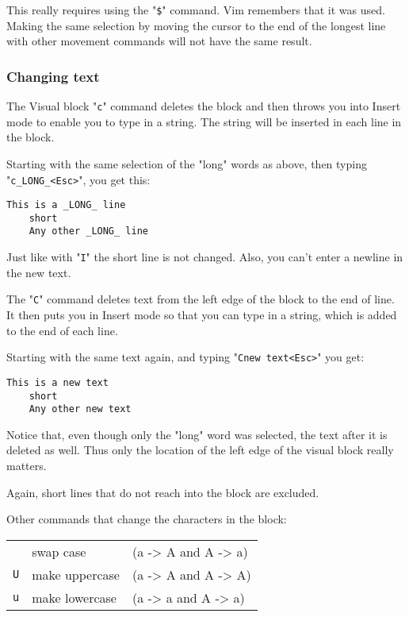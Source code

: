 {This really requires using the "\texttt{\$}" command.
Vim remembers that it was used.
Making the same selection by moving the cursor to the end of the longest line with other movement commands will not have the same result.
\subsubsection{Changing text}
The Visual block "\texttt{c}" command deletes the block and then throws you into Insert mode to enable you to type in a string.
The string will be inserted in each line in the block.

Starting with the same selection of the "long" words as above, then typing "\texttt{c\_LONG\_<Esc>}", you get this:

\begin{Verbatim}[samepage=true]
    This is a _LONG_ line 
    short 
    Any other _LONG_ line 
\end{Verbatim}

Just like with "\texttt{I}" the short line is not changed.
Also, you can't enter a newline in the new text.

The "\texttt{C}" command deletes text from the left edge of the block to the end of line.
It then puts you in Insert mode so that you can type in a string, which is added to the end of each line.

Starting with the same text again, and typing "\texttt{Cnew text<Esc>}" you get:

\begin{Verbatim}[samepage=true]
    This is a new text 
    short 
    Any other new text 
\end{Verbatim}

Notice that, even though only the "long" word was selected, the text after it is deleted as well.
Thus only the location of the left edge of the visual block really matters.

Again, short lines that do not reach into the block are excluded.

Other commands that change the characters in the block:

\begin{center} \begin{tabular}{l l l}
	\texttt{~} & swap case & (a -> A and A -> a) \\
	\texttt{U} & make uppercase & (a -> A and A -> A) \\
	\texttt{u} & make lowercase & (a -> a and A -> a) \\
\end{tabular} \end{center}

}
